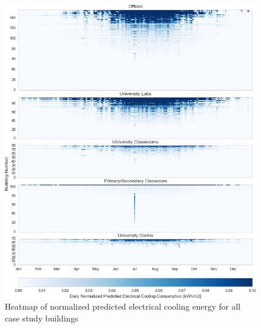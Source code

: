 \begin{figure}[ht!]
\begin{center}
\includegraphics[width=1\columnwidth]{figures/cooling_heatmap/cooling_heatmap}
\caption{Heatmap of normalized predicted electrical cooling energy for all case study buildings
\label{fig:cooling_heatmap}%
}
\end{center}
\end{figure}

